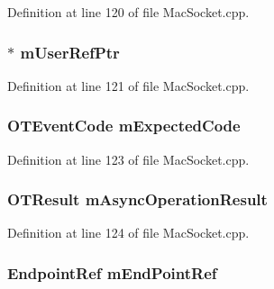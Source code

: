 Definition at line 120 of file Mac\+Socket.\+cpp.

\subsubsection[{\texorpdfstring{m\+User\+Ref\+Ptr}{mUserRefPtr}}]{$\ast$ m\+User\+Ref\+Ptr}\hypertarget{struct_socket_struct_ad4f85b13ba101a9d94dfdf6ad4bae473}{}\label{struct_socket_struct_ad4f85b13ba101a9d94dfdf6ad4bae473}


Definition at line 121 of file Mac\+Socket.\+cpp.

\subsubsection[{\texorpdfstring{m\+Expected\+Code}{mExpectedCode}}]{\setlength{\rightskip}{0pt plus 5cm}O\+T\+Event\+Code m\+Expected\+Code}\hypertarget{struct_socket_struct_a7c7606344b0597bdd61bd1c945689c0a}{}\label{struct_socket_struct_a7c7606344b0597bdd61bd1c945689c0a}


Definition at line 123 of file Mac\+Socket.\+cpp.

\subsubsection[{\texorpdfstring{m\+Async\+Operation\+Result}{mAsyncOperationResult}}]{\setlength{\rightskip}{0pt plus 5cm}O\+T\+Result m\+Async\+Operation\+Result}\hypertarget{struct_socket_struct_a94731da6743b8173762a07657f1b0b1f}{}\label{struct_socket_struct_a94731da6743b8173762a07657f1b0b1f}


Definition at line 124 of file Mac\+Socket.\+cpp.

\subsubsection[{\texorpdfstring{m\+End\+Point\+Ref}{mEndPointRef}}]{\setlength{\rightskip}{0pt plus 5cm}Endpoint\+Ref m\+End\+Point\+Ref}\hypertarget{struct_socket_struct_aa7508a8f247a125cafcf3ad164c6912c}{}\label{struct_socket_struct_aa7508a8f247a125cafcf3ad164c6912c}


